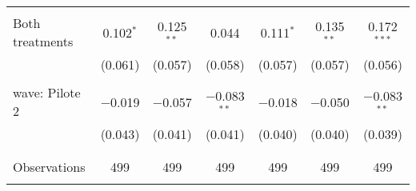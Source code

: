 \begin{tabular}{@{\extracolsep{5pt}}lcccccc}
  & & & & & & \\ 
 Both treatments & 0.102$^{*}$ & 0.125$^{**}$ & 0.044 & 0.111$^{*}$ & 0.135$^{**}$ & 0.172$^{***}$ \\ 
  & (0.061) & (0.057) & (0.058) & (0.057) & (0.057) & (0.056) \\ 
  & & & & & & \\ 
 wave: Pilote 2 & $-$0.019 & $-$0.057 & $-$0.083$^{**}$ & $-$0.018 & $-$0.050 & $-$0.083$^{**}$ \\ 
  & (0.043) & (0.041) & (0.041) & (0.040) & (0.040) & (0.039) \\ 
  & & & & & & \\ 
\hline \\[-1.8ex] 

Observations & 499 & 499 & 499 & 499 & 499 & 499 \\ 
\hline 
\hline \\[-1.8ex] 
\end{tabular} 